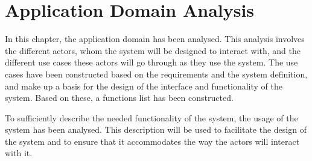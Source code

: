 \chapter{Application Domain Analysis} \label{ch:applicationdomain}
In this chapter, the application domain has been analysed. This analysis involves the different actors, whom the system will be designed to interact with, and the different use cases these actors will go through as they use the system. The use cases have been constructed based on the requirements and the system definition, and make up a basis for the design of the interface and functionality of the system. Based on these, a functions list has been constructed.
\par
To sufficiently describe the needed functionality of the system, the usage of the system has been analysed. This description will be used to facilitate the design of the system and to ensure that it accommodates the way the actors will interact with it.